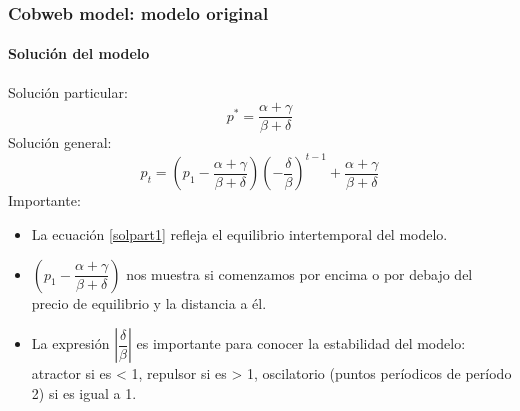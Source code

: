 \documentclass[11pt]{beamer}
\begin{document}
\begin{frame}
\frametitle{Cobweb model: modelo original}
\framesubtitle{Solución del modelo}	
Solución particular:
\begin{equation}\label{solpart1}
p^{*}=\dfrac{\alpha+\gamma}{\beta+\delta}
\end{equation}
Solución general:
\begin{equation}
p_t=\left( p_1-\dfrac{\alpha+\gamma}{\beta+\delta}\right) \left(-\dfrac{\delta}{\beta} \right)^{t-1}+
\dfrac{\alpha+\gamma}{\beta+\delta} 
\end{equation}
Importante:
\begin{itemize}
\scriptsize	\item La ecuación \ref{solpart1} refleja el equilibrio intertemporal del modelo.
	\item $\left( p_1-\dfrac{\alpha+\gamma}{\beta+\delta}\right)$ nos muestra si comenzamos por encima o por debajo del precio de equilibrio y la distancia a él.
	\item La expresión $\left|\dfrac{\delta}{\beta} \right|$ es importante para conocer la estabilidad del modelo: atractor si es < 1, repulsor si es > 1, oscilatorio (puntos períodicos de período 2) si es igual a 1.
\end{itemize}
\end{frame}
\end{document}
